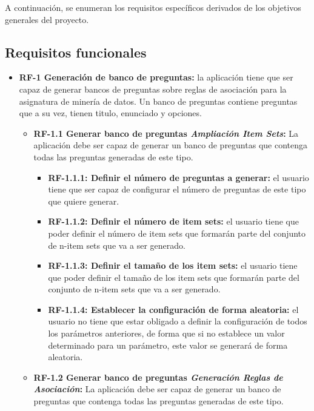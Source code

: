 A continuación, se enumeran los requisitos específicos derivados de los objetivos generales del proyecto.

\subsection{Requisitos funcionales}\label{requisitos-funcionales}

\begin{itemize}
\tightlist
\item
  \textbf{RF-1 Generación de banco de preguntas:} la aplicación tiene que ser capaz de generar bancos de preguntas sobre reglas de asociación para la asignatura de minería de datos. Un banco de preguntas contiene preguntas que a su vez, tienen titulo, enunciado y opciones.

  \begin{itemize}
  \tightlist
  \item
    \textbf{RF-1.1 Generar banco de preguntas \textit{Ampliación Item Sets}:} La aplicación debe ser capaz de generar un banco de preguntas que contenga todas las preguntas generadas de este tipo.

    \begin{itemize}
    \tightlist
    \item
      \textbf{RF-1.1.1: Definir el número de preguntas a generar:} el usuario tiene que ser capaz de configurar el número de preguntas de este tipo que quiere generar.
    \item
      \textbf{RF-1.1.2: Definir el número de item sets:} el usuario tiene que poder definir el número de item sets que formarán parte del conjunto de n-item sets que va a ser generado.
    \item 
      \textbf{RF-1.1.3: Definir el tamaño de los item sets:} el usuario tiene que poder definir el tamaño de los item sets que formarán parte del conjunto de n-item sets que va a ser generado.
    \item
      \textbf{RF-1.1.4: Establecer la configuración de forma aleatoria:} el usuario no tiene que estar obligado a definir la configuración de todos los parámetros anteriores, de forma que si no establece un valor determinado para un parámetro, este valor se generará de forma aleatoria.
    \end{itemize}
  \item
    \textbf{RF-1.2 Generar banco de preguntas \textit{Generación Reglas de Asociación}:} La aplicación debe ser capaz de generar un banco de preguntas que contenga todas las preguntas generadas de este tipo.


\end{itemize}
\end{itemize}

